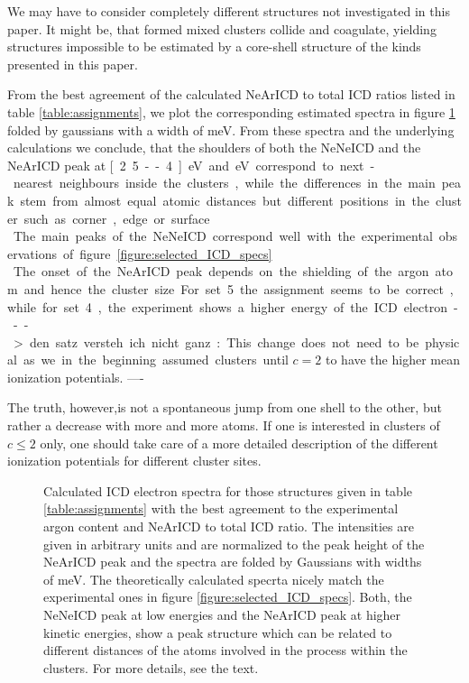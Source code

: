 We may have to consider completely different structures not investigated in this
paper. It might be, that formed mixed clusters collide and coagulate, yielding
structures impossible to be estimated by a core-shell structure of the kinds
presented in this paper. 

From the best agreement of the calculated NeArICD to total ICD ratios listed in table
\ref{table:assignments}, we plot the corresponding estimated spectra in figure
\ref{figure:theo_specs} folded by gaussians with a width of \unit[250]{meV}.
From these spectra and the underlying calculations
we conclude, that the shoulders of both the NeNeICD and the NeArICD peak
at \unit[2.5--4]{eV} and \unit[8--10]{eV}
correspond to next-nearest neighbours inside the clusters, while the differences
in the main peak stem from almost equal atomic distances but different positions
in the cluster such as corner, edge or surface.\\
The main peaks of the NeNeICD correspond well with the experimental observations
of figure \ref{figure:selected_ICD_specs}.\\
The onset of the NeArICD peak depends on the shielding of the argon atom
and hence the cluster size. For set 5 the assignment seems to be correct, while
for set 4, the experiment shows a higher energy of the ICD electron. 

---> den satz versteh ich nicht ganz:
This change does not need to be physical as we in the beginning assumed clusters
until $c=2$ to have the higher mean ionization potentials. 
----

The truth, however,is not a spontaneous jump from one shell to the other, but rather a decrease
with more and more atoms. If one is interested in clusters of $c\le2$ only, one
should take care of a more detailed description of the different ionization
potentials for different cluster sites.\\

\begin{figure}[!ht]
  \centering
  
  \caption{Calculated ICD electron spectra for those structures given in table
           \ref{table:assignments} with the best agreement to the experimental
           argon content and NeArICD to total ICD ratio. The intensities are given
           in arbitrary units and are normalized to the peak height of the NeArICD
           peak and the spectra are folded by Gaussians with widths of \unit[250]{meV}.
           The theoretically calculated specrta nicely match the experimental ones in figure
           \ref{figure:selected_ICD_specs}.
           Both, the NeNeICD peak at low energies and the NeArICD peak
           at higher kinetic energies, show a peak structure which can be related
           to different distances of the atoms involved in the process within the
           clusters. For more details, see the text.}
  \label{figure:theo_specs}
\end{figure}
